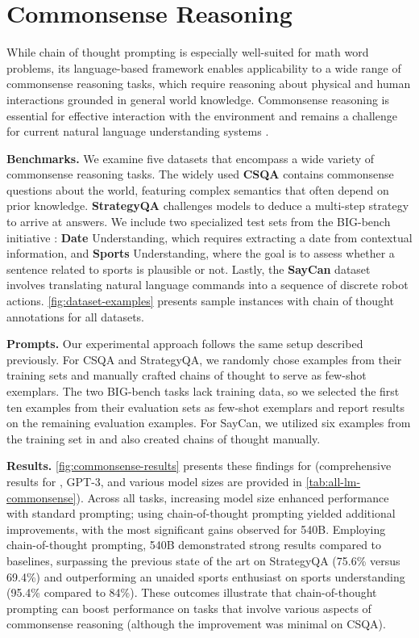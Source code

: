 \section{Commonsense Reasoning}\label{sec:commonsense-reasoning}

While chain of thought prompting is especially well-suited for math word problems, its language-based framework enables applicability to a wide range of commonsense reasoning tasks, which require reasoning about physical and human interactions grounded in general world knowledge. Commonsense reasoning is essential for effective interaction with the environment and remains a challenge for current natural language understanding systems \citep{talmor2022commonsenseqa}.

\textbf{Benchmarks.}  
We examine five datasets that encompass a wide variety of commonsense reasoning tasks. The widely used \textbf{CSQA} \citep{talmor-etal-2019-commonsenseqa} contains commonsense questions about the world, featuring complex semantics that often depend on prior knowledge.  
\textbf{StrategyQA} \citep{geva-etal-2021-aristotle} challenges models to deduce a multi-step strategy to arrive at answers. We include two specialized test sets from the BIG-bench initiative \citep{bigbench}: \textbf{Date} Understanding, which requires extracting a date from contextual information, and \textbf{Sports} Understanding, where the goal is to assess whether a sentence related to sports is plausible or not. Lastly, the \textbf{SayCan} dataset \citep{ahn2022can} involves translating natural language commands into a sequence of discrete robot actions.  
\cref{fig:dataset-examples} presents sample instances with chain of thought annotations for all datasets.

\textbf{Prompts.}  
Our experimental approach follows the same setup described previously. For CSQA and StrategyQA, we randomly chose examples from their training sets and manually crafted chains of thought to serve as few-shot exemplars. The two BIG-bench tasks lack training data, so we selected the first ten examples from their evaluation sets as few-shot exemplars and report results on the remaining evaluation examples. For SayCan, we utilized six examples from the training set in \citet{ahn2022can} and also created chains of thought manually.

\textbf{Results.}  
\cref{fig:commonsense-results} presents these findings for \palm{} (comprehensive results for \lamda{}, GPT-3, and various model sizes are provided in \cref{tab:all-lm-commonsense}).  
Across all tasks, increasing model size enhanced performance with standard prompting; using chain-of-thought prompting yielded additional improvements, with the most significant gains observed for \palm{} 540B. Employing chain-of-thought prompting, \palm{} 540B demonstrated strong results compared to baselines, surpassing the previous state of the art on StrategyQA (75.6\% versus 69.4\%) and outperforming an unaided sports enthusiast on sports understanding (95.4\% compared to 84\%).  
These outcomes illustrate that chain-of-thought prompting can boost performance on tasks that involve various aspects of commonsense reasoning (although the improvement was minimal on CSQA).

